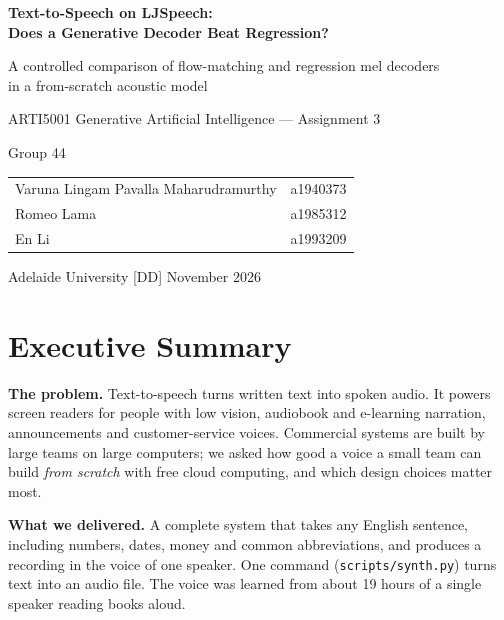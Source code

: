 \documentclass[11pt,a4paper]{article}
\newcommand{\ph}[1]{\colorbox{red!12}{\textcolor{red!70!black}{\small\textsf{[#1]}}}}
\begin{document}
\begin{titlepage}
\centering
\vspace*{3cm}
{\LARGE\bfseries Text-to-Speech on LJSpeech:\\[6pt]
Does a Generative Decoder Beat Regression?\par}
\vspace{8mm}
{\large A controlled comparison of flow-matching and regression mel decoders\\ in a from-scratch acoustic model\par}
\vspace{2cm}
{\large ARTI5001 Generative Artificial Intelligence --- Assignment 3\par}
\vspace{1cm}
{\large Group 44\par}
\vspace{5mm}
{\large
\begin{tabular}{ll}
Varuna Lingam Pavalla Maharudramurthy & a1940373 \\
Romeo Lama & a1985312 \\
En Li & a1993209 \\
\end{tabular}\par}
\vfill
{\large Adelaide University \quad\textbullet\quad \ph{DD} November 2026\par}
\end{titlepage}

\section*{Executive Summary}
\noindent\textbf{The problem.} Text-to-speech turns written text into spoken audio. It powers screen readers for people with low vision, audiobook and e-learning narration, announcements and customer-service voices. Commercial systems are built by large teams on large computers; we asked how good a voice a small team can build \emph{from scratch} with free cloud computing, and which design choices matter most.

\noindent\textbf{What we delivered.} A complete system that takes any English sentence, including numbers, dates, money and common abbreviations, and produces a recording in the voice of one speaker. One command (\texttt{scripts/synth.py}) turns text into an audio file. The voice was learned from about 19 hours of a single speaker reading books aloud.
\end{document}

